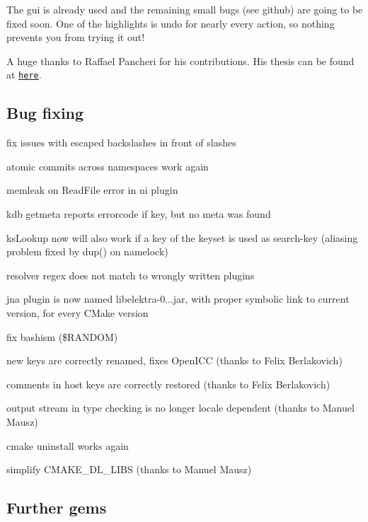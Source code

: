 The gui is already used and the remaining small bugs (see github) are going to be fixed soon. One of the highlights is undo for nearly every action, so nothing prevents you from trying it out!

A huge thanks to Raffael Pancheri for his contributions. His thesis can be found at \href{https://www.libelektra.org/ftp/elektra/pancheri2015gui.pdf}{\tt here}.

\subsection*{Bug fixing}


\begin{DoxyItemize}
\item fix issues with escaped backslashes in front of slashes
\item atomic commits across namespaces work again
\item memleak on Read\+File error in ni plugin
\item {\ttfamily kdb getmeta} reports errorcode if key, but no meta was found
\item {\ttfamily ks\+Lookup} now will also work if a key of the keyset is used as search-\/key (aliasing problem fixed by dup() on namelock)
\item resolver regex does not match to wrongly written plugins
\item jna plugin is now named libelektra-\/0...\+jar, with proper symbolic link to current version, for every C\+Make version
\item fix bashism ({\ttfamily \$\+R\+A\+N\+D\+OM})
\item new keys are correctly renamed, fixes Open\+I\+CC (thanks to Felix Berlakovich)
\item comments in host keys are correctly restored (thanks to Felix Berlakovich)
\item output stream in type checking is no longer locale dependent (thanks to Manuel Mausz)
\item cmake uninstall works again
\item simplify {\ttfamily C\+M\+A\+K\+E\+\_\+\+D\+L\+\_\+\+L\+I\+BS} (thanks to Manuel Mausz)
\end{DoxyItemize}

\subsection*{Further gems}


